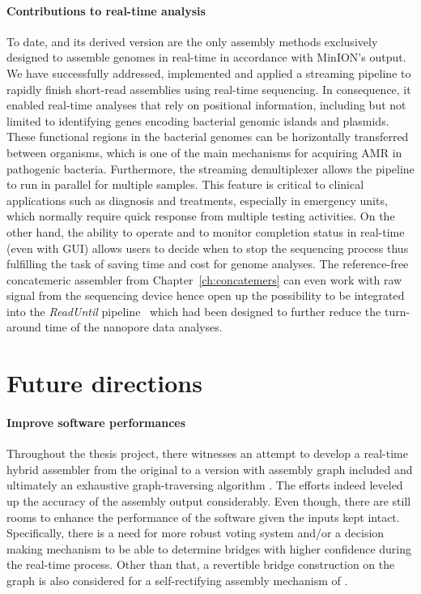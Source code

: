 \paragraph{Contributions to real-time analysis}
To date, \npscarf{} and its derived version \npgraph{} are the only assembly methods exclusively designed to assemble genomes in real-time in accordance with MinION's output.
We have successfully addressed, implemented and applied a streaming pipeline to rapidly finish short-read assemblies using real-time sequencing.
In consequence, it enabled real-time analyses that rely on positional information, including but not limited to identifying genes encoding bacterial genomic islands and plasmids.
These functional regions in the bacterial genomes can be horizontally  transferred  between  organisms,  which  is  one  of  the  main  mechanisms for acquiring AMR in pathogenic bacteria.  
Furthermore, the streaming demultiplexer \npbarcode{} allows the pipeline to run in parallel for multiple samples.
This feature is critical to clinical applications such as diagnosis and treatments, especially in emergency units, which normally require quick response from multiple testing activities.
On the other hand, the ability to operate and to monitor completion status in real-time (even with GUI) allows users to decide when to stop the sequencing process thus fulfilling the task of saving time and cost for genome analyses.
The reference-free concatemeric assembler from Chapter~\ref{ch:concatemers} can even work with raw signal from the sequencing device hence open up the possibility to be integrated into the \emph{ReadUntil} pipeline~\cite{LooseMS2016} which had been designed to further reduce the turn-around time of the nanopore data analyses.
\section{Future directions}
\paragraph{Improve software performances}
Throughout the thesis project, there witnesses an attempt to develop a real-time hybrid assembler from the original \npscarf{} to a version with assembly graph included and ultimately an exhaustive graph-traversing algorithm \npgraph{}. 
The efforts indeed leveled up the accuracy of the assembly output considerably.
Even though, there are still rooms to enhance the performance of the software given the inputs kept intact.
Specifically, there is a need for more robust voting system and/or a decision making mechanism to be able to determine bridges with higher confidence during the real-time process.  
Other than that, a revertible bridge construction on the graph is also considered for a self-rectifying assembly mechanism of \npgraph{}. 

